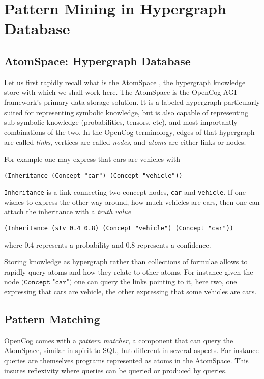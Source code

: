 \documentclass[runningheads]{llncs}
\begin{document}
\section{Pattern Mining in Hypergraph Database}
\label{PMHD}

\subsection{AtomSpace: Hypergraph Database}

Let us first rapidly recall what is the AtomSpace
\cite{Goertzel2014EGI2}, the hypergraph knowledge store with which we
shall work here.  The AtomSpace is the OpenCog AGI framework's primary
data storage solution. It is a labeled hypergraph particularly suited
for representing symbolic knowledge, but is also capable of
representing sub-symbolic knowledge (probabilities, tensors, etc), and
most importantly combinations of the two. In the OpenCog terminology,
edges of that hypergraph are called \emph{links}, vertices are called
\emph{nodes}, and \emph{atoms} are either links or nodes.

For example
one may express that cars are vehicles with
\begin{verbatim}
(Inheritance (Concept "car") (Concept "vehicle"))
\end{verbatim}
\texttt{Inheritance} is a link connecting two concept nodes,
\texttt{car} and \texttt{vehicle}.  If one wishes to express the other
way around, how much vehicles are cars, then one can attach the
inheritance with a \emph{truth value}
\begin{verbatim}
(Inheritance (stv 0.4 0.8) (Concept "vehicle") (Concept "car"))
\end{verbatim}
where 0.4 represents a probability and 0.8 represents a confidence.

Storing knowledge as hypergraph rather than collections of formulae
allows to rapidly query atoms and how they relate to other atoms. For
instance given the node $\texttt{(Concept "car")}$ one can query the
links pointing to it, here two, one expressing that cars are vehicle,
the other expressing that some vehicles are cars.

\subsection{Pattern Matching}
\label{PM}

OpenCog comes with a \emph{pattern matcher}, a component that can
query the AtomSpace, similar in spirit to SQL, but different in
several aspects. For instance queries are themselves programs
represented as atoms in the AtomSpace. This insures reflexivity where
queries can be queried or produced by queries. 
\end{document}
